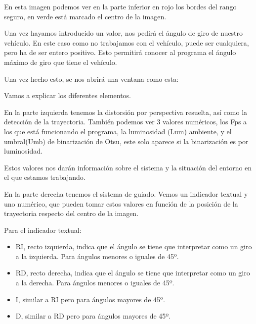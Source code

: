 En esta imagen podemos ver en la parte inferior en rojo los bordes del rango seguro, en verde está marcado el centro de la imagen.

Una vez hayamos introducido un valor, nos pedirá el ángulo de giro de nuestro vehículo. En este caso como no trabajamos con el vehículo, puede ser cualquiera, pero ha de ser entero positivo. Esto permitirá conocer al programa el ángulo máximo de giro que tiene el vehículo.


Una vez hecho esto, se nos abrirá una ventana como esta:



Vamos a explicar los diferentes elementos. 

En la parte izquierda tenemos la distorsión por perspectiva resuelta, así como la detección de la trayectoria. También podemos ver 3 valores numéricos, los Fps a los que está funcionando el programa, la luminosidad (Lum) ambiente, y el umbral(Umb) de binarización de Otsu, este solo aparece si la binarización es por luminosidad.

Estos valores nos darán información sobre el sistema y la situación del entorno en el que estamos trabajando.

En la parte derecha tenemos el sistema de guiado. Vemos un indicador textual y uno numérico, que pueden tomar estos valores en función de la posición de la trayectoria respecto del centro de la imagen.

Para el indicador textual:

\begin{itemize}

	\item RI, recto izquierda, indica que el ángulo se tiene que interpretar como un giro a la izquierda. Para ángulos menores o iguales de 45º.
	
	\item RD, recto derecha, indica que el ángulo se tiene que interpretar como un giro a la derecha. Para ángulos menores o iguales de 45º.
	\item I, similar a RI pero para ángulos mayores de 45º.
	
	\item D, similar a RD pero para ángulos mayores de 45º.
	
\end{itemize}

